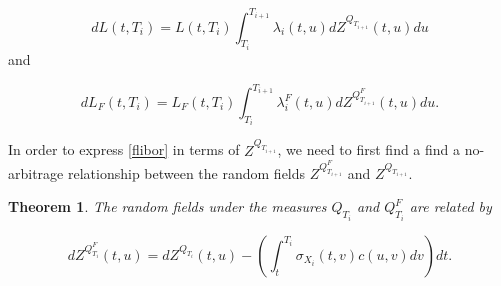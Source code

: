 \documentclass[11pt]{article}
\newtheorem{theorem}{Theorem}[section]
\begin{document}
\begin{equation}\label{dlibor}
    dL(t,T_i)=L(t,T_i)\int_{T_i}^{T_{i+1}}\lambda_i(t,u)dZ^{Q_{T_{i+1}}}(t,u)du
\end{equation}
and


\begin{equation}\label{dflibor}
    dL_F(t,T_i)=L_F(t,T_i)\int_{T_i}^{T_{i+1}}\lambda_i^F(t,u)dZ^{Q^F_{T_{i+1}}}(t,u)du.
\end{equation}





In order to express \eqref{flibor} in terms of $Z^{Q_{T_{i+1}}}$, we need to first find a find a no-arbitrage relationship between the random fields $Z^{Q^F_{T_{i+1}}}$ and $Z^{Q_{T_{i+1}}}.$ 

\begin{theorem}




The random fields under the measures $Q_{T_i}$ and $Q^F_{T_i}$ are related by 

\begin{equation}\label{zf}
    dZ^{Q^F_{T_i}}(t,u)=dZ^{Q_{T_i}}(t,u)-\left(\int_t^{T_i}\sigma_{X_i}(t,v)c(u,v)dv\right)dt.
\end{equation}


\end{theorem}
\end{document}
